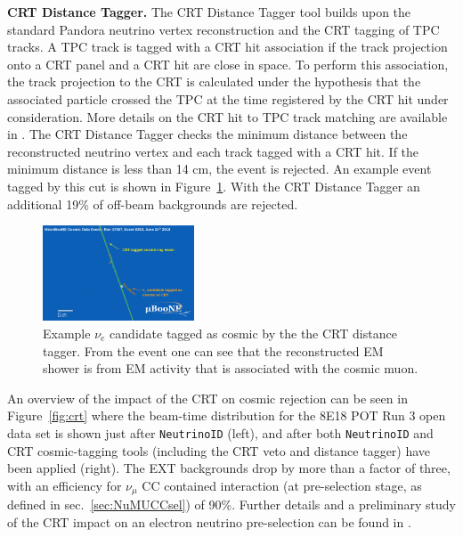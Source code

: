 \textbf{CRT Distance Tagger.} 
The CRT Distance Tagger tool builds upon the standard Pandora neutrino vertex reconstruction and the CRT tagging of TPC tracks. A TPC track is tagged with a CRT hit association if the track projection onto a CRT panel and a CRT hit are close in space. 
To perform this association, the track projection to the CRT is calculated under the hypothesis that the associated particle crossed the TPC at the time registered by the CRT hit under consideration. More details on the CRT hit to TPC track matching are available in \cite{bib:CRTPresel_Technote}.  The CRT Distance Tagger checks the minimum distance between the reconstructed neutrino vertex and each track tagged with a CRT hit. If the minimum distance is less than 14 cm, the event is rejected. An example event tagged by this cut is shown in Figure~\ref{fig:crtdist00}.  With the CRT Distance Tagger an additional 19\% of off-beam backgrounds are rejected.%
 
\begin{figure}[h!]
\centering
\includegraphics[width=0.4\textwidth]{NuId-Ch3/Images/crttagger_01.png}
\caption{Example $\nu_e$ candidate tagged as cosmic by the the CRT distance tagger. From the event one can see that the reconstructed EM shower is from EM activity that is associated with the cosmic muon.}
\label{fig:crtdist00}
\end{figure}

An overview of the impact of the CRT on cosmic rejection can be seen in Figure~\ref{fig:crt} where the beam-time distribution for the 8E18 POT Run 3 open data set is shown just after \texttt{NeutrinoID} (left), and after both \texttt{NeutrinoID} and CRT cosmic-tagging tools (including the CRT veto and distance tagger) have been applied (right). The EXT backgrounds drop by more than a factor of three, with an efficiency for $\nu_{\mu}$ CC contained interaction (at pre-selection stage, as defined in sec.~\ref{sec:NuMUCCsel}) of 90\%.
Further details and a preliminary study of the CRT  impact on an electron neutrino pre-selection can be found in \cite{bib:CRTPresel_Technote}. 

